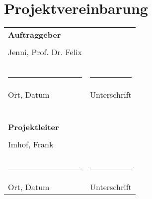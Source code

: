 \section{Projektvereinbarung} \label{sec:projektvereinbarung}
\begin{tabular}{l l}
\textbf{Auftraggeber} &\\
&\\
Jenni, Prof. Dr. Felix& \\
&\\
&\\
&\\
\rule{6cm}{0.5pt} & \rule{6cm}{0.5pt}\\
Ort, Datum & Unterschrift\\
&\\
&\\
&\\
&\\
&\\
&\\
\textbf{Projektleiter} &\\
&\\
Imhof, Frank &\\
&\\
&\\
&\\
\rule{6cm}{0.5pt} & \rule{6cm}{0.5pt}\\
Ort, Datum & Unterschrift\\
\end{tabular}

